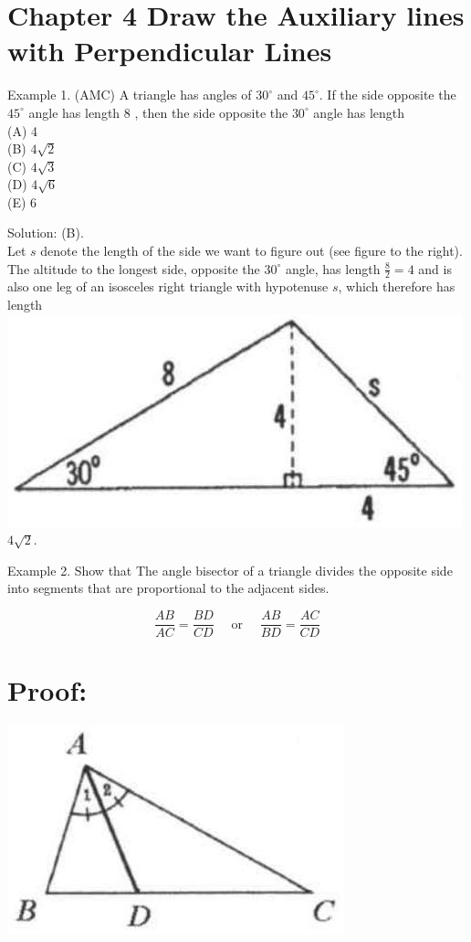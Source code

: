 \documentclass[10pt]{article}
\begin{document}
\section*{Chapter 4 Draw the Auxiliary lines with Perpendicular Lines}
Example 1. (AMC) A triangle has angles of \(30^{\circ}\) and \(45^{\circ}\). If the side opposite the \(45^{\circ}\) angle has length 8 , then the side opposite the \(30^{\circ}\) angle has length\\
(A) 4\\
(B) \(4 \sqrt{2}\)\\
(C) \(4 \sqrt{3}\)\\
(D) \(4 \sqrt{6}\)\\
(E) 6

Solution: (B).\\
Let \(s\) denote the length of the side we want to figure out (see figure to the right). The altitude to the longest side, opposite the \(30^{\circ}\) angle, has length \(\frac{8}{2}=4\) and is also one leg of an isosceles right triangle with hypotenuse \(s\), which therefore has length\\
\includegraphics[max width=\textwidth]{2025_04_17_97bc1f7e44d93c271a88g-075(1)} \(4 \sqrt{2}\).

Example 2. Show that The angle bisector of a triangle divides the opposite side into segments that are proportional to the adjacent sides.

\[
\frac{A B}{A C}=\frac{B D}{C D} \quad \text { or } \quad \frac{A B}{B D}=\frac{A C}{C D}
\]

\section*{Proof:}
\begin{center}
\includegraphics[max width=\textwidth]{2025_04_17_97bc1f7e44d93c271a88g-075}
\end{center}
\end{document}
